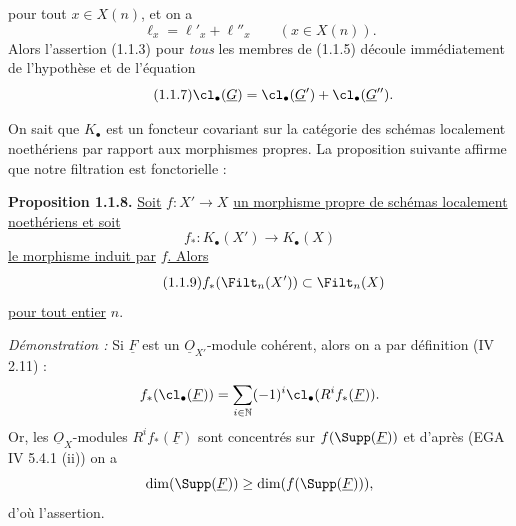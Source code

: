 
pour tout $x\in X(n)$, et on a
\begin{equation}\tag{1.1.6}
\ell_x=\ell'_x+\ell''_x\qquad (x\in X(n)).
\end{equation}
Alors l'assertion (1.1.3) pour \emph{tous} les membres de (1.1.5) découle immédiatement de l'hypothèse et de l'équation
\begin{equation}\tag{1.1.7}
\cl_\bullet(\underline{G})=\cl_\bullet(\underline{G}')+\cl_\bullet(\underline{G}'').
\end{equation}

On sait que $K_\bullet$ est un foncteur covariant sur la catégorie des schémas localement noethériens par rapport aux morphismes propres. La proposition suivante affirme que notre filtration est fonctorielle :

\textbf{Proposition 1.1.8.} \uline{Soit} $f:X'\to X$ \uline{un morphisme propre de schémas localement noethériens et soit}
\[
f_*:K_\bullet(X')\longrightarrow K_\bullet(X)
\]
\uline{le morphisme induit par} $f$\uline{. Alors}
\begin{equation}\tag{1.1.9}
f_*(\Filt_n(X'))\subset\Filt_n(X)
\end{equation}
\uline{pour tout entier} $n$.

\emph{Démonstration :} Si $\underline{F}$ est un $\underline{O}_{X'}$-module cohérent, alors on a par définition (IV 2.11) :
\[
f_*(\cl_\bullet(\underline{F}))=\sum_{i\in\mathbb N}(-1)^i\cl_\bullet(R^if_*(\underline{F})).
\]
Or, les $\underline{O}_X$-modules $R^if_*(\underline{F})$ sont concentrés sur $f(\Supp(\underline{F}))$ et d'après (EGA IV 5.4.1 (ii)) on a
\[
\dim(\Supp(\underline{F}))\geq\dim(f(\Supp(\underline{F}))),
\]
d'où l'assertion.

